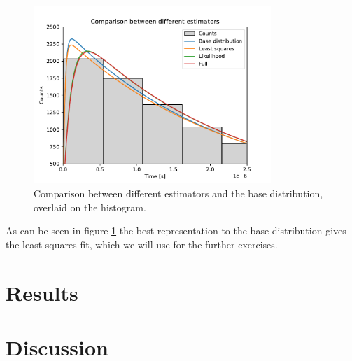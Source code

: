 \documentclass[11pt, a4paper, oneside]{book}
\newcommand\Plotwidth{0.8}
\begin{document}
\begin{figure}[h]
    \centering
    \includegraphics[width=\Plotwidth\textwidth]{images/comparison_estimators.pdf}
    \caption{Comparison between different estimators and the base distribution, overlaid on the histogram.}
    \label{fig:comparison_estimators}
\end{figure}

As can be seen in figure \ref{fig:comparison_estimators} the best representation to the base distribution gives the least squares fit, which we will use for the further exercises.



\chapter{Results}

\chapter{Discussion}


\end{document}

